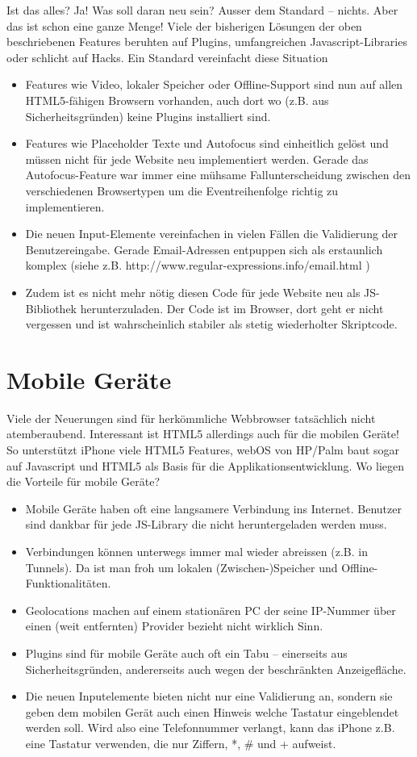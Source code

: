\documentclass[a4paper,10pt]{scrreprt}
\begin{document}
Ist das alles? Ja! Was soll daran neu sein? Ausser dem Standard – nichts. Aber das ist schon eine
ganze Menge! Viele der bisherigen Lösungen der oben beschriebenen Features beruhten auf
Plugins, umfangreichen Javascript-Libraries oder schlicht auf Hacks. Ein Standard vereinfacht
diese Situation
\begin{itemize}
 \item Features wie Video, lokaler Speicher oder Offline-Support sind nun auf allen HTML5-fähigen
Browsern vorhanden, auch dort wo (z.B. aus Sicherheitsgründen) keine Plugins installiert
sind.
\item Features wie Placeholder Texte und Autofocus sind einheitlich gelöst und müssen nicht für
jede Website neu implementiert werden. Gerade das Autofocus-Feature war immer eine
mühsame Fallunterscheidung zwischen den verschiedenen Browsertypen um die
Eventreihenfolge richtig zu implementieren.
\item Die neuen Input-Elemente vereinfachen in vielen Fällen die Validierung der Benutzereingabe.
Gerade Email-Adressen entpuppen sich als erstaunlich komplex (siehe z.B.
http://www.regular-expressions.info/email.html )
\item Zudem ist es nicht mehr nötig diesen Code für jede Website neu als JS-Bibliothek
herunterzuladen. Der Code ist im Browser, dort geht er nicht vergessen und ist
wahrscheinlich stabiler als stetig wiederholter Skriptcode.
\end{itemize}

\section{Mobile Geräte}
Viele der Neuerungen sind für herkömmliche Webbrowser tatsächlich nicht atemberaubend.
Interessant ist HTML5 allerdings auch für die mobilen Geräte! So unterstützt iPhone viele HTML5
Features, webOS von HP/Palm baut sogar auf Javascript und HTML5 als Basis für die
Applikationsentwicklung. Wo liegen die Vorteile für mobile Geräte?
\begin{itemize}
\item Mobile Geräte haben oft eine langsamere Verbindung ins Internet. Benutzer sind dankbar
für jede JS-Library die nicht heruntergeladen werden muss.
\item Verbindungen können unterwegs immer mal wieder abreissen (z.B. in Tunnels). Da ist man
froh um lokalen (Zwischen-)Speicher und Offline-Funktionalitäten.
\item Geolocations machen auf einem stationären PC der seine IP-Nummer über einen (weit
entfernten) Provider bezieht nicht wirklich Sinn.
\item Plugins sind für mobile Geräte auch oft ein Tabu – einerseits aus Sicherheitsgründen,
andererseits auch wegen der beschränkten Anzeigefläche.
\item Die neuen Inputelemente bieten nicht nur eine Validierung an, sondern sie geben dem
mobilen Gerät auch einen Hinweis welche Tastatur eingeblendet werden soll. Wird also eine
Telefonnummer verlangt, kann das iPhone z.B. eine Tastatur verwenden, die nur Ziffern, *, \#
und + aufweist.
\end{itemize}
\end{document}

